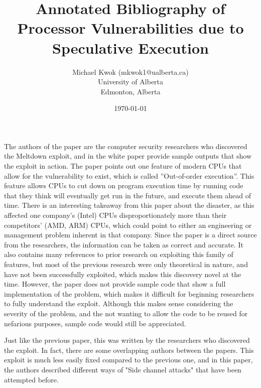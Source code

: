 \documentclass[11pt]{article}
\title{Annotated Bibliography of \\ Processor Vulnerabilities due to \\
Speculative Execution}
\author{Michael Kwok (mkwok1@ualberta.ca) \\ University of Alberta \\ Edmonton,
Alberta}
\date{\today}
\begin{document}
\pagestyle{headings}
\maketitle

\cite{Meltdown} 

The authors of the paper are the computer security researchers who discovered
the Meltdown exploit, and in the white paper provide sample outputs that show
the exploit in action. The paper points out one feature of modern CPUs that
allow for the vulnerability to exist, which is called ”Out-of-order execution”.
This feature allows CPUs to cut down on program execution time by running code
that they think will eventually get run in the future, and execute them ahead of
time. There is an interesting takeaway from this paper about the disaster, as
this affected one company’s (Intel) CPUs disproportionately more than their
competitors’ (AMD, ARM) CPUs, which could point to either an engineering or
management problem inherent in that company. Since the paper is a direct source
from the researchers, the information can be taken as correct and accurate. It
also contains many references to prior research on exploiting this family of
features, but most of the previous research were only theoretical in nature,
and have not been successfully exploited, which makes this discovery novel at
the time. However, the paper does not provide sample code that show a full
implementation of the problem, which makes it difficult for beginning
researchers to fully understand the exploit. Although this makes sense
considering the severity of the problem, and the not wanting to allow the code
to be reused for nefarious purposes, sample code would still be appreciated.

\hfill

\cite{Spectre} 

Just like the previous paper, this was written by the researchers who
discovered the exploit. In fact, there are some overlapping authors between the
papers. This exploit is much less easily fixed compared to the previous one, and
in this paper, the authors described different ways of "Side channel attacks"
that have been attempted before.

\end{document}
